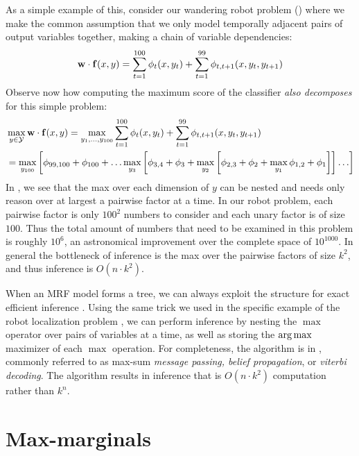 As a simple example of this, consider our wandering robot problem 
() where we make the common assumption that we only model 
temporally adjacent pairs of output variables together, making a chain of 
variable dependencies:
\begin{equation*}
\mathbf{w} \cdot \mathbf{f}(x,y) = \sum_{t=1}^{100} \phi_t(x,y_t) + \sum_{t=1}^{99} 
\phi_{t,t+1}(x,y_t,y_{t+1})
\end{equation*}
Observe now how computing the maximum score of the classifier {\em also 
decomposes} for this simple problem:
\begin{align}
&\max_{y \in \mathcal{Y}} \mathbf{w} \cdot \mathbf{f}(x,y) = \max_{y_1,\ldots,y_{100}} 
\sum_{t=1}^{100} \phi_t(x,y_t) + \sum_{t=1}^{99} \phi_{t,t+1}(x,y_t,y_{t+1}) \\
&= \max_{y_{100}} \left[ \phi_{99,100} + \phi_{100} + \ldots \max_{y_3} \left[\phi_{3,4} + \phi_3 +  \max_{y_2} \left[ \phi_{2,3} + \phi_2 + \max_{y_1} \phi_{1,2} + \phi_1 \right] \right] \ldots \right] 
\label{eq:nesting} \end{align} 
In , we see that the max over each dimension of $y$ can be
nested and needs only reason over at largest a pairwise factor at a time.  In 
our robot problem, each pairwise factor is only $100^2$ numbers to consider and 
each unary factor is of size $100$. Thus the total amount of numbers that need 
to be examined in this problem is roughly $10^6$, an astronomical improvement 
over the complete space of $10^{1000}$. In general the bottleneck of inference 
is the max over the pairwise factors of size $k^2$, and thus inference is $O(n 
\cdot k^2)$.

When an MRF model forms a tree, we can always exploit the structure for exact 
efficient inference \citep{koller-book}.  Using the same trick we used in the 
specific example of the robot localization problem , we can 
perform inference by nesting the $\max$ operator over pairs of variables at a 
time, as well as storing the $\mathop{\arg\max}$ maximizer of each $\max$ operation.  For 
completeness, the algorithm is in , commonly referred to 
as max-sum {\em message passing, belief propagation}, or {\em viterbi 
decoding}.  The algorithm results in inference that is $O(n\cdot k^2)$ 
computation rather than $k^n$.



\section{Max-marginals}\label{sec:max-marginals}


